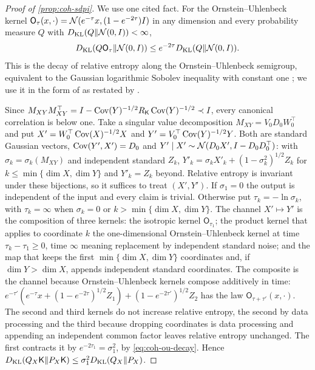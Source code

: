\begin{proof}[Proof of \cref{prop:coh-sdpi}]
We use one cited fact. For the Ornstein--Uhlenbeck kernel $\mathsf O_\tau(x,\cdot)=\mathcal{N}(e^{-\tau}x,(1-e^{-2\tau})I)$ in any dimension and every probability measure $Q$ with $D_{\mathrm{KL}}(Q\Vert\mathcal{N}(0,I))<\infty$,
\begin{equation}\label{eq:coh-ou-decay}
D_{\mathrm{KL}}(Q\mathsf O_\tau\Vert\mathcal{N}(0,I))\le e^{-2\tau}D_{\mathrm{KL}}(Q\Vert\mathcal{N}(0,I)).
\end{equation}
This is the decay of relative entropy along the Ornstein--Uhlenbeck semigroup, equivalent to the Gaussian logarithmic Sobolev inequality with constant one \citep{gross1975logarithmic}; we use it in the form of \citet[Theorem~5.2.1]{bakry2014analysis} as restated by \citet[Section~2.3]{ledoux2015stein}.

Since $M_{XY}M_{XY}^\top=I-\operatorname{Cov}(Y)^{-1/2}R_{\mathsf K}\operatorname{Cov}(Y)^{-1/2}\prec I$, every canonical correlation is below one. Take a singular value decomposition $M_{XY}=V_0D_0W_0^\top$ and put $X'=W_0^\top\operatorname{Cov}(X)^{-1/2}X$ and $Y'=V_0^\top\operatorname{Cov}(Y)^{-1/2}Y$. Both are standard Gaussian vectors, $\operatorname{Cov}(Y',X')=D_0$ and $Y'\mid X'\sim\mathcal{N}(D_0X',I-D_0D_0^\top)$: with $\sigma_k=\sigma_k(M_{XY})$ and independent standard $Z_k$, $Y'_k=\sigma_kX'_k+(1-\sigma_k^2)^{1/2}Z_k$ for $k\le\min\{\dim X,\dim Y\}$ and $Y'_k=Z_k$ beyond. Relative entropy is invariant under these bijections, so it suffices to treat $(X',Y')$. If $\sigma_1=0$ the output is independent of the input and every claim is trivial. Otherwise put $\tau_k=-\ln\sigma_k$, with $\tau_k=\infty$ when $\sigma_k=0$ or $k>\min\{\dim X,\dim Y\}$. The channel $X'\mapsto Y'$ is the composition of three kernels: the isotropic kernel $\mathsf O_{\tau_1}$; the product kernel that applies to coordinate $k$ the one-dimensional Ornstein--Uhlenbeck kernel at time $\tau_k-\tau_1\ge0$, time $\infty$ meaning replacement by independent standard noise; and the map that keeps the first $\min\{\dim X,\dim Y\}$ coordinates and, if $\dim Y>\dim X$, appends independent standard coordinates. The composite is the channel because Ornstein--Uhlenbeck kernels compose additively in time: $e^{-\tau'}(e^{-\tau}x+(1-e^{-2\tau})^{1/2}Z_1)+(1-e^{-2\tau'})^{1/2}Z_2$ has the law $\mathsf O_{\tau+\tau'}(x,\cdot)$. The second and third kernels do not increase relative entropy, the second by data processing and the third because dropping coordinates is data processing and appending an independent common factor leaves relative entropy unchanged. The first contracts it by $e^{-2\tau_1}=\sigma_1^2$, by \eqref{eq:coh-ou-decay}. Hence $D_{\mathrm{KL}}(Q_X\mathsf K\Vert P_X\mathsf K)\le\sigma_1^2D_{\mathrm{KL}}(Q_X\Vert P_X)$.


\end{proof}
